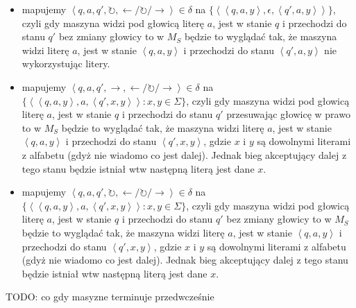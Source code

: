 \documentclass{article}
\theoremstyle{definition}
\theoremstyle{remark}
\begin{document}
\begin{itemize}
\begin{itemize}
\item mapujemy \( \left<q, a, q', \circlearrowright, \leftarrow / \circlearrowright / \rightarrow \right> \in \delta\) na \( \{ \left< \left<q,a,y\right>, \epsilon, \left<q',a,y\right> \right>\} \), czyli gdy maszyna widzi pod głowicą literę \(a\), jest w stanie \(q\) i przechodzi do stanu \(q'\) bez zmiany głowicy to w \(M_S\) będzie to wyglądać tak, że maszyna widzi literę \(a\), jest w stanie \(\left<q,a,y\right>\) i przechodzi do stanu \(\left<q',a,y\right>\) nie wykorzystując litery.
\item mapujemy \( \left<q, a, q', \rightarrow, \leftarrow / \circlearrowright / \rightarrow \right> \in \delta\) na \( \{ \left< \left<q,a,y\right>, a, \left<q',x,y\right> \right>: x,y \in \Sigma \} \), czyli gdy maszyna widzi pod głowicą literę \(a\), jest w stanie \(q\) i przechodzi do stanu \(q'\) przesuwając głowicę w prawo to w \(M_S\) będzie to wyglądać tak, że maszyna widzi literę \(a\), jest w stanie \(\left<q,a,y\right>\) i przechodzi do stanu \(\left<q',x,y\right>\), gdzie \(x\) i \(y\) są dowolnymi literami z alfabetu (gdyż nie wiadomo co jest dalej). Jednak bieg akceptujący dalej z tego stanu będzie istniał wtw następną literą jest dane \(x\).
\item mapujemy \( \left<q, a, q', \circlearrowright, \leftarrow / \circlearrowright / \rightarrow \right> \in \delta\) na \( \{ \left< \left<q,a,y\right>, a, \left<q',x,y\right> \right>: x,y \in \Sigma \} \), czyli gdy maszyna widzi pod głowicą literę \(a\), jest w stanie \(q\) i przechodzi do stanu \(q'\) bez zmiany głowicy to w \(M_S\) będzie to wyglądać tak, że maszyna widzi literę \(a\), jest w stanie \(\left<q,a,y\right>\) i przechodzi do stanu \(\left<q',x,y\right>\), gdzie \(x\) i \(y\) są dowolnymi literami z alfabetu (gdyż nie wiadomo co jest dalej). Jednak bieg akceptujący dalej z tego stanu będzie istniał wtw następną literą jest dane \(x\).
\end{itemize}
\end{itemize}

TODO: co gdy masyzne terminuje przedwcześnie
\end{document}
